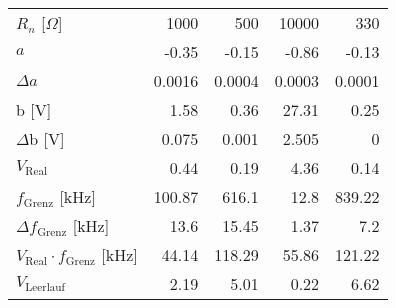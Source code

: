 \begin{tabular}{lrrrr}
\hline
 $R_n$ [$\Omega$]                           & 1000      & 500      & 10000      & 330      \\
 $a$                                        &   -0.35   &  -0.15   &    -0.86   &  -0.13   \\
 $\Delta a$                                 &    0.0016 &   0.0004 &     0.0003 &   0.0001 \\
 b [V]                                      &    1.58   &   0.36   &    27.31   &   0.25   \\
 $\Delta$b [V]                              &    0.075  &   0.001  &     2.505  &   0      \\
 $V_\text{Real}$                            &    0.44   &   0.19   &     4.36   &   0.14   \\
 $f_\text{Grenz}$ [kHz]                     &  100.87   & 616.1    &    12.8    & 839.22   \\
 $\Delta f_\text{Grenz}$ [kHz]              &   13.6    &  15.45   &     1.37   &   7.2    \\
 $V_\text{Real} \cdot f_\text{Grenz}$ [kHz] &   44.14   & 118.29   &    55.86   & 121.22   \\
 $V_\text{Leerlauf}$                        &    2.19   &   5.01   &     0.22   &   6.62   \\
\hline
\end{tabular}